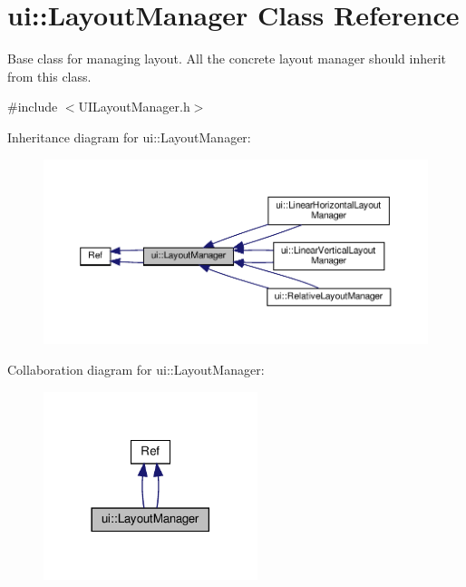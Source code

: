 \hypertarget{classui_1_1LayoutManager}{}\section{ui\+:\+:Layout\+Manager Class Reference}
\label{classui_1_1LayoutManager}


Base class for managing layout. All the concrete layout manager should inherit from this class.  




{\ttfamily \#include $<$U\+I\+Layout\+Manager.\+h$>$}



Inheritance diagram for ui\+:\+:Layout\+Manager\+:
\nopagebreak
\begin{figure}[H]
\begin{center}
\leavevmode
\includegraphics[width=350pt]{classui_1_1LayoutManager__inherit__graph}
\end{center}
\end{figure}


Collaboration diagram for ui\+:\+:Layout\+Manager\+:
\nopagebreak
\begin{figure}[H]
\begin{center}
\leavevmode
\includegraphics[width=177pt]{classui_1_1LayoutManager__coll__graph}
\end{center}
\end{figure}
